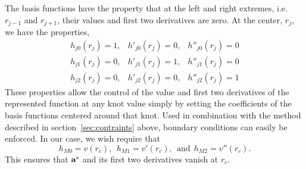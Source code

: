 The basis functions have the property that at the left and right
extremes, i.e. $r_{j-1}$ and $r_{j+1}$, their values and first two
derivatives are zero.  At the center, $r_j$, we have the properties,
\begin{eqnarray}
h_{j0}(r_j)=1, & h'_{j0}(r_j)=0, & h''_{j0}(r_j)= 0 \\
h_{j1}(r_j)=0, & h'_{j1}(r_j)=1, & h''_{j1}(r_j)= 0 \\
h_{j2}(r_j)=0, & h'_{j2}(r_j)=0, & h''_{j2}(r_j)= 1 
\end{eqnarray}
These properties allow the control of the value and first two derivatives
of the represented function at any knot value simply by setting the
coefficients of the basis functions centered around that knot.  Used
in combination with the method described in
section~\ref{sec:contraints} above, boundary conditions can easily be
enforced.  In our case, we wish require that
\begin{equation}
h_{M0} = v(r_c), \ \ h_{M1} = v'(r_c), \ \ \text{and} \ \  h_{M2} = v''(r_c).
\end{equation}
This ensures that $\mathbf{a}^{\text{s}}$ and its first two derivatives vanish at $r_c$.

